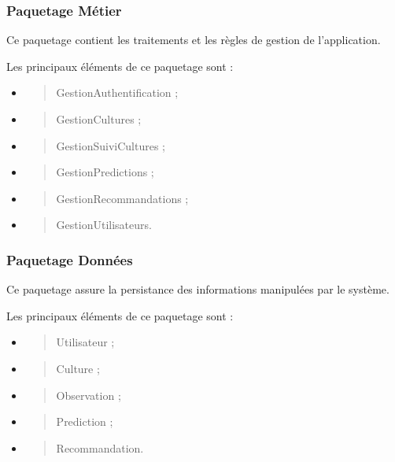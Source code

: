 \documentclass[
]{article}
\begin{document}
\hypertarget{paquetage-muxe9tier}{%
\subsubsection{Paquetage Métier}\label{paquetage-muxe9tier}}

Ce paquetage contient les traitements et les règles de gestion de
l'application.

Les principaux éléments de ce paquetage sont :

\begin{itemize}
\item
  \begin{quote}
  GestionAuthentification ;
  \end{quote}
\item
  \begin{quote}
  GestionCultures ;
  \end{quote}
\item
  \begin{quote}
  GestionSuiviCultures ;
  \end{quote}
\item
  \begin{quote}
  GestionPredictions ;
  \end{quote}
\item
  \begin{quote}
  GestionRecommandations ;
  \end{quote}
\item
  \begin{quote}
  GestionUtilisateurs.
  \end{quote}
\end{itemize}

\hypertarget{paquetage-donnuxe9es}{%
\subsubsection{Paquetage Données}\label{paquetage-donnuxe9es}}

Ce paquetage assure la persistance des informations manipulées par le
système.

Les principaux éléments de ce paquetage sont :

\begin{itemize}
\item
  \begin{quote}
  Utilisateur ;
  \end{quote}
\item
  \begin{quote}
  Culture ;
  \end{quote}
\item
  \begin{quote}
  Observation ;
  \end{quote}
\item
  \begin{quote}
  Prediction ;
  \end{quote}
\item
  \begin{quote}
  Recommandation.
  \end{quote}
\end{itemize}
\end{document}
